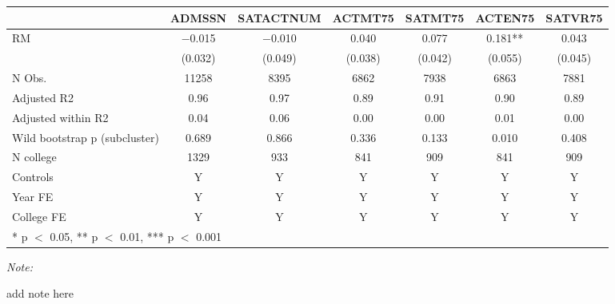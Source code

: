 \begin{table}
\centering
\begin{threeparttable}
\begin{tabular}[t]{lcccccc}
\toprule
  & ADMSSN & SATACTNUM & ACTMT75 & SATMT75 & ACTEN75 & SATVR75\\
\midrule
RM & \num{-0.015} & \num{-0.010} & \num{0.040} & \num{0.077} & \num{0.181}** & \num{0.043}\\
 & (\num{0.032}) & (\num{0.049}) & (\num{0.038}) & (\num{0.042}) & (\num{0.055}) & (\num{0.045})\\
\midrule
N Obs. & \num{11258} & \num{8395} & \num{6862} & \num{7938} & \num{6863} & \num{7881}\\
Adjusted R2 & \num{0.96} & \num{0.97} & \num{0.89} & \num{0.91} & \num{0.90} & \num{0.89}\\
Adjusted within R2 & \num{0.04} & \num{0.06} & \num{0.00} & \num{0.00} & \num{0.01} & \num{0.00}\\
Wild bootstrap p (subcluster) & 0.689 & 0.866 & 0.336 & 0.133 & 0.010 & 0.408\\
N college & 1329 & 933 & 841 & 909 & 841 & 909\\
Controls & Y & Y & Y & Y & Y & Y\\
Year FE & Y & Y & Y & Y & Y & Y\\
College FE & Y & Y & Y & Y & Y & Y\\
\bottomrule
\multicolumn{7}{l}{\rule{0pt}{1em}* p $<$ 0.05, ** p $<$ 0.01, *** p $<$ 0.001}\\
\end{tabular}
\begin{tablenotes}
\item \textit{Note: } 
\item add note here
\end{tablenotes}
\end{threeparttable}
\end{table}
